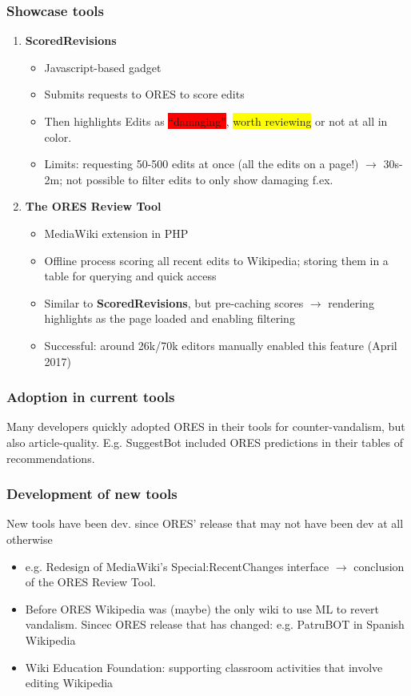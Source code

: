 \documentclass[12pt,a4paper]{article}
\begin{document}
\subsubsection{Showcase tools}
\begin{enumerate}
\item \textbf{ScoredRevisions}
\begin{itemize}
\item Javascript-based gadget
\item Submits requests to ORES to score edits
\item Then highlights Edits as \colorbox{red}{``damaging''}, \colorbox{yellow}{worth reviewing} or not at all in color.
\item Limits: requesting 50-500 edits at once (all the edits on a page!) \(\rightarrow\) 30s-2m; not possible to filter edits to only show damaging f.ex.
\end{itemize}
\item \textbf{The ORES Review Tool}
\begin{itemize}
\item MediaWiki extension in PHP
\item Offline process scoring all recent edits to Wikipedia; storing them in a table for querying and quick access
\item Similar to \textbf{ScoredRevisions}, but pre-caching scores \(\rightarrow\) rendering highlights as the page loaded and enabling filtering
\item Successful: around 26k/70k editors manually enabled this feature (April 2017)
\end{itemize}
\end{enumerate}
\subsubsection{Adoption in current tools}
Many developers quickly adopted ORES in their tools for counter-vandalism, but also article-quality. E.g. SuggestBot included ORES predictions in their tables of recommendations.
\subsubsection{Development of new tools}
New tools have been dev. since ORES' release that may not have been dev at all otherwise
\begin{itemize}
\item e.g. Redesign of MediaWiki's Special:RecentChanges interface \(\rightarrow\) conclusion of the ORES Review Tool.
\item Before ORES Wikipedia was (maybe) the only wiki to use ML to revert vandalism. Sincec ORES release that has changed: e.g. PatruBOT in Spanish Wikipedia
\item Wiki Education Foundation: supporting classroom activities that involve editing Wikipedia
\end{itemize}
\end{document}
